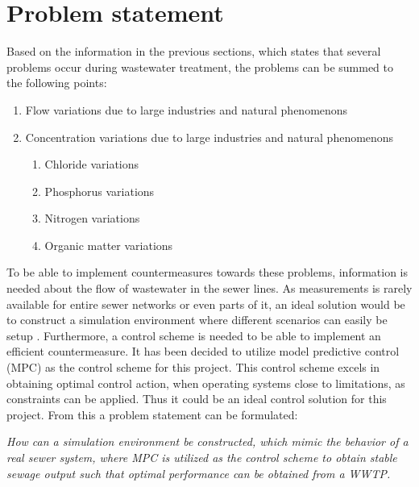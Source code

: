 \newpage
\section{Problem statement}\label{sec:problem_statement}

Based on the information in the previous sections, which states that several problems occur during wastewater treatment, the problems can be summed to the following points:

\begin{enumerate}
\item Flow variations due to large industries and natural phenomenons
\item Concentration variations due to large industries and natural phenomenons
\begin{enumerate}
	\item Chloride variations
	\item Phosphorus variations
	\item Nitrogen variations
	\item Organic matter variations
\end{enumerate}
\end{enumerate}

To be able to implement countermeasures towards these problems, information is needed about the flow of wastewater in the sewer lines. As measurements is rarely available for entire sewer networks or even parts of it, an ideal solution would be to construct a simulation environment where different scenarios can easily be setup \cite{fredericia_spildevand_mode}. Furthermore, a control scheme is needed to be able to implement an efficient countermeasure. It has been decided to utilize model predictive control (MPC) as the control scheme for this project. This control scheme excels in obtaining optimal control action, when operating systems close to limitations, as constraints can be applied. Thus it could be an ideal control solution for this project.
From this a problem statement can be formulated: \\
\begin{center}
\textit{How can a simulation environment be constructed, which mimic the behavior of a real sewer system, where MPC is utilized as the control scheme to obtain stable sewage output such that optimal performance can be obtained from a WWTP.}
\end{center}